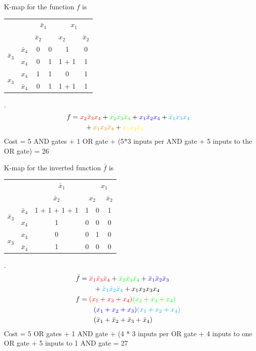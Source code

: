 \documentclass[twocolumn]{article}
\newcommand{\bx}{\bar{x}}
\newcommand{\cred}{\color{red}}
\newcommand{\cg}{\color{green}}
\newcommand{\cb}{\color{blue}}
\begin{document}
K-map for the function $f$ is
\\
\begin{tabular}{c|c|c|c|c|c}
  \toprule
  && \multicolumn{2}{c|}{$\bx_1$} & \multicolumn{2}{c}{$x_1$}
  \\
  && $\bx_2$ & \multicolumn{2}{c|}{$x_2$} & $\bx_2$
  \\ \midrule
  \multirow{2}{*}{$\bx_3$} & $\bx_4$
                                  & 0 & 0 &  \color{yellow} 1 & 0
  \\
  & $x_4$
                                  & 0 & \cred 1 & \cred 1 + \color{yellow} 1 & \cb 1
  \\
  \multirow{2}{*}{$x_3$}   &  $x_4$
                                  & \color{cyan} 1 & \color{cyan} 1 & 0 & \cb 1
  \\
  & $\bx_4$
                                  & 0 & \cg 1 & \cg 1 + \color{orange} 1 & \color{orange} 1
  \\\bottomrule
\end{tabular}.
\\
\begin{align*}
f &= { \cred x_2 \bx_3 x_4 } +  { \cg x_2 x_3 \bx_4} + {\cb x_1 \bx_2 x_4} +
  {\color{cyan} \bx_1 x_3 x_4 }
  \\
  &\qquad + {\color{orange} x_1 x_3 \bx_4} +
{\color{yellow} x_1 x_2 \bx_3 }
  \end{align*}
 Cost = 5 AND gates + 1 OR gate + (5*3 inputs per AND gate + 5 inputs to the OR
 gate) = 26

 K-map for the inverted function $\bar{f}$ is
 \\
 \begin{tabular}{c|c|c|c|c|c}
   \toprule
   && \multicolumn{2}{c|}{$\bx_1$} & \multicolumn{2}{c}{$x_1$}
   \\
   && $\bx_2$ & \multicolumn{2}{c|}{$x_2$} & $\bx_2$
   \\ \midrule
   \multirow{2}{*}{$\bx_3$} & $\bx_4$
                                   & \cred 1 + \cg 1 + \cb 1 + \color{cyan} 1 & \cred 1 &  0 &  \cg 1
   \\
   & $x_4$
                                   & \cb 1 & 0 & 0 & 0
   \\
   \multirow{2}{*}{$x_3$}   &  $x_4$
                                   & 0 & 0 & 1 & 0
   \\
   & $\bx_4$
                                   & \color{cyan} 1 & 0 & 0 & 0
   \\\bottomrule
 \end{tabular}.
 \\
 \begin{align*}
   \bar{f} &= {\cred \bx_1 \bx_3 \bx_4 } + {\cg \bx_2 \bx_3 \bx_4} + {\cb \bx_1 \bx_2 \bx_3 }
   \\
   &\qquad + {\color{cyan} \bx_1 \bx_2 \bx_4 } + x_1 x_2 x_3 x_4
   \\
   f &= {\cred (x_1 + x_3 + x_4) } {\cg (x_2 + x_3 + x_4)} 
   \\
           &\qquad {\cb (x_1 + x_2 + x_3)}{\color{cyan} (x_1 + x_2 + x_4)}
   \\
   &\qquad (\bx_1 + \bx_2+ \bx_3 + \bx_4)
 \end{align*}
 Cost = 5 OR gates + 1 AND gate + (4 * 3 inputs per OR gate + 4 inputs to one OR
 gate + 5 inputs to 1 AND gate = 27
\end{document}
